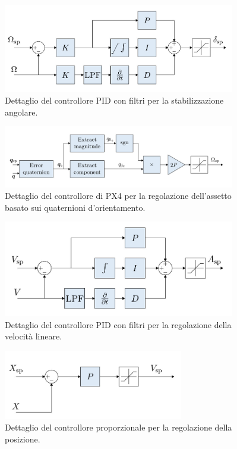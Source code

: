 \begin{figure}
    \centering
    \includegraphics[width=0.9\textwidth]{figs/chapter3/px4-angularcont.jpg}
    \caption{Dettaglio del controllore PID con filtri per la stabilizzazione angolare.}
    \label{fig:px4angular}
\end{figure}

\begin{figure}
    \centering
    \includegraphics[width=0.9\textwidth]{figs/chapter3/px4-attitude.jpg}
    \caption{Dettaglio del controllore di PX4 per la regolazione dell'assetto basato sui quaternioni d'orientamento.}
    \label{fig:px4attitude}
\end{figure}

\begin{figure}
    \centering
    \includegraphics[width=0.9\textwidth]{figs/chapter3/px4-velocity.jpg}
    \caption{Dettaglio del controllore PID con filtri per la regolazione della velocità lineare.}
    \label{fig:px4velocity}
\end{figure}

\begin{figure}
    \centering
    \includegraphics[width=0.7\textwidth]{figs/chapter3/px4-position.jpg}
    \caption{Dettaglio del controllore proporzionale per la regolazione della posizione.}
    \label{fig:px4position}
\end{figure}

